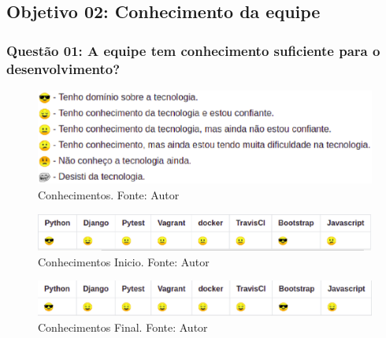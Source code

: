 \subsection{Objetivo 02: Conhecimento da equipe}

\subsubsection{Questão 01: A equipe tem conhecimento suficiente para o desenvolvimento?}


\begin{figure}[h!]
	\centering
  \includegraphics[keepaspectratio=true,scale=0.6]{figuras/conhecimento_lista.eps}
  \caption[Conhecimentos.]{Conhecimentos. Fonte: Autor}
	\label{fig:conhecimentos}
\end{figure}

\begin{figure}[h!]
	\centering
  \includegraphics[keepaspectratio=true,scale=0.6]{figuras/conhecimento_inicio.eps}
  \caption[Conhecimentos Inicio.]{Conhecimentos Inicio. Fonte: Autor}
	\label{fig:conhecimentos_inicio}
\end{figure}

\begin{figure}[h!]
	\centering
  \includegraphics[keepaspectratio=true,scale=0.6]{figuras/conhecimento_final.eps}
  \caption[Conhecimentos Final.]{Conhecimentos Final. Fonte: Autor}
	\label{fig:conhecimentos_final}
\end{figure}

